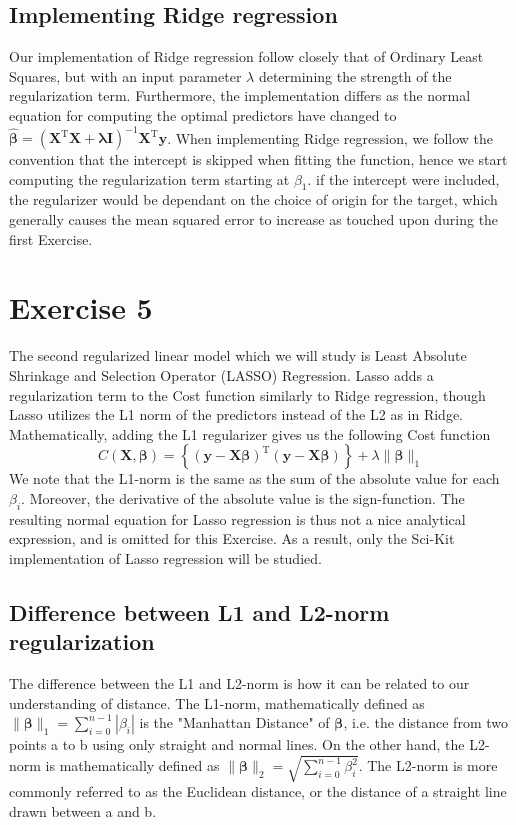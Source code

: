 \documentclass[11pt, a4paper]{article}
\begin{document}
\subsection*{Implementing Ridge regression}
Our implementation of Ridge regression follow closely that of Ordinary Least Squares, but with an input parameter $\lambda$ determining the strength of the regularization term. Furthermore, the implementation differs as the normal equation for computing the optimal predictors have changed to $\bm{\hat{\beta}} = \left(\bm{X}^\text{T}\bm{X} + \bm{\lambda}\bm{I}\right)^{-1}\bm{X}^\text{T}\bm{y}$. When implementing Ridge regression, we follow the convention that the intercept is skipped when fitting the function, hence we start computing the regularization term starting at $\beta_1$. \cite{Geron2019} if the intercept were included, the regularizer would be dependant on the choice of origin for the target, which generally causes the mean squared error to increase as touched upon during the first Exercise.

\section*{Exercise 5}
The second regularized linear model which we will study is Least Absolute Shrinkage and Selection Operator (LASSO) Regression. Lasso adds a regularization term to the Cost function similarly to Ridge regression, though Lasso utilizes the L1 norm of the predictors instead of the L2 as in Ridge. \cite{Geron2019} Mathematically, adding the L1 regularizer gives us the following Cost function 
\[
  C\left(\bm{X},\bm{\beta}\right) = \left\{\left(\bm{y}-\bm{X}\bm{\beta}\right)^\text{T}\left(\bm{y}-\bm{X}\bm{\beta}\right)\right\}+\lambda\lVert \bm{\beta}\rVert_1
\]
We note that the L1-norm is the same as the sum of the absolute value for each $\beta_i$. Moreover, the derivative of the absolute value is the sign-function. The resulting normal equation for Lasso regression is thus not a nice analytical expression, and is omitted for this Exercise. As a result, only the Sci-Kit implementation of Lasso regression will be studied.

\subsection*{Difference between L1 and L2-norm regularization}
The difference between the L1 and L2-norm is how it can be related to our understanding of distance. The L1-norm, mathematically defined as $\lVert \bm{\beta} \rVert_1 = \sum_{i=0}^{n-1}|\beta_i|$ is the "Manhattan Distance" of $\bm{\beta}$, i.e. the distance from two points a to b using only straight and normal lines. On the other hand, the L2-norm is mathematically defined as $\lVert \bm{\beta} \rVert_2 = \sqrt{\sum_{i=0}^{n-1}\beta_i^2}$. The L2-norm is more commonly referred to as the Euclidean distance, or the distance of a straight line drawn between a and b.
\end{document}
